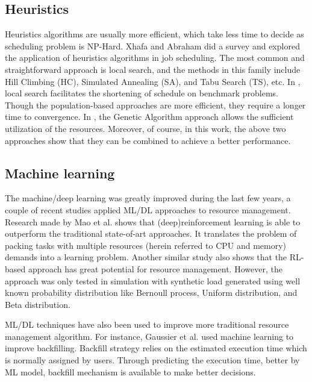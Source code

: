 \subsection{Heuristics}
Heuristics algorithms are usually more efficient, which take less time to decide as scheduling problem is NP-Hard. 
Xhafa and Abraham did a survey\cite{xhafa2010computational} and explored the application of heuristics algorithms in job scheduling. 
The most common and straightforward approach is local search, and the methods in this family include Hill Climbing (HC), Simulated Annealing (SA), and Tabu Search (TS), etc. 
In \cite{ritchie2003fast}, local search facilitates the shortening of  schedule on benchmark problems. 
Though the population-based approaches are more efficient, they require a longer time to convergence. 
In \cite{abraham2000nature}, the Genetic Algorithm approach allows the sufficient utilization of the resources. 
Moreover, of course, in this work, the above two approaches show that they can be combined to achieve a better performance. 

\subsection{Machine learning}
The machine/deep learning was greatly improved during the last few years, a couple of recent studies applied ML/DL approaches to resource  management.  Research made by Mao et al.\cite{mao2016resource} shows that (deep)reinforcement learning is able to outperform the  traditional state-of-art approaches. 
It translates the problem of packing tasks with multiple resources (herein referred to CPU and memory) demands into a learning problem. 
Another similar study\cite{8622393} also shows that the RL-based approach has great potential for resource management. 
However, the approach was only tested in simulation with synthetic load generated using well known probability distribution like Bernoull process, Uniform distribution, and Beta distribution. 

ML/DL techniques have also been used to improve more traditional resource management algorithm.
For instance, Gaussier et al.\cite{7832838} used machine learning to improve backfilling. 
Backfill strategy relies on the estimated execution time which is normally assigned by users. Through predicting the execution time, better by ML model, backfill mechanism is available to make better decisions.



